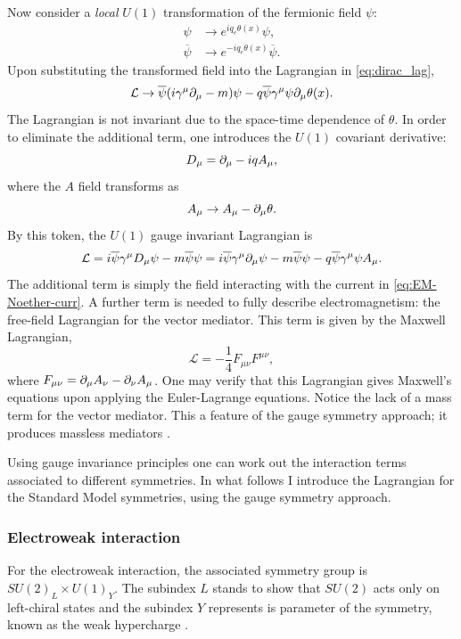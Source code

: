 Now consider a \textit{local} $U(1)$ transformation of the fermionic field $\psi$:
\begin{align*}
    \psi &\longrightarrow e^{iq_e\theta(x)}\psi,\\
    \overline{\psi} &\longrightarrow e^{-iq_e\theta(x)}\overline{\psi}.
\end{align*}
Upon substituting the transformed field into the Lagrangian in \eqref{eq:dirac_lag}, 
\begin{equation}
    \mathcal{L}\rightarrow  \overline{\psi}(i\gamma^\mu \dcov-m)\psi-q\overline{\psi}\gamma^\mu\psi\dcov \theta(x).
\end{equation}
The Lagrangian is not invariant due to the space-time dependence of $\theta$. In order to eliminate the additional term, one introduces the $U(1)$ covariant derivative:
\begin{equation}
    D_\mu = \dcov - iq A_\mu,
\end{equation}
where the $A$ field transforms as
\begin{equation}
    A_\mu \rightarrow A_\mu - \dcov \theta.
\end{equation}
By this token, the $U(1)$ gauge invariant Lagrangian is
\begin{equation}
    \mathcal{L}=i\overline{\psi}\gamma^\mu D_\mu \psi - m\overline{\psi}\psi = i\overline{\psi}\gamma^\mu\dcov \psi - m\overline{\psi}\psi-q\overline{\psi}\gamma^\mu\psi A_\mu.
\end{equation}
The additional term is simply the field interacting with the current in \eqref{eq:EM-Noether-curr}. A further term is needed to fully describe electromagnetism: the free-field Lagrangian for the vector mediator. This term is given by the Maxwell Lagrangian,
\begin{equation}\label{eq:EM-free-field}
    \mathcal{L}=-\frac{1}{4}F_{\mu\nu}F^{\mu\nu},
\end{equation}
where $F_{\mu\nu}=\dcov A_\nu-\dcov[\nu] A_\mu$. One may verify that this Lagrangian gives Maxwell's equations upon applying the Euler-Lagrange equations. Notice the lack of a mass term for the vector mediator. This a feature of the gauge symmetry approach; it produces massless mediators \cite{goldberg_standard_2017}.

Using gauge invariance principles one can work out the interaction terms associated to different symmetries. In what follows I introduce the Lagrangian for the Standard Model symmetries, using the gauge symmetry approach.

\subsubsection*{Electroweak interaction}
For the electroweak interaction, the associated symmetry group is $SU(2)_{L}\times U(1)_{Y}$. The subindex $L$ stands to show that $SU(2)$ acts only on left-chiral states and the subindex $Y$ represents is parameter of the symmetry, known as the weak hypercharge \cite{goldberg_standard_2017}.

